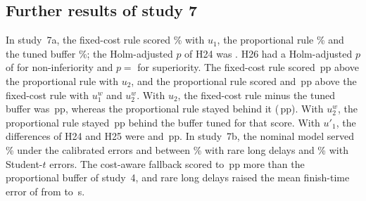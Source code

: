 \subsection{Further results of study 7}
In study~7a, the fixed-cost rule scored \% with $u_1$, the proportional rule \%
and the tuned buffer \%; the Holm-adjusted $p$ of H24 was . H26 had a
Holm-adjusted $p$ of  for non-inferiority and $p={}$ for superiority. The
fixed-cost rule scored \,pp above the proportional rule with $u_2$, and the proportional rule
scored  and \,pp above the fixed-cost rule with $u^w_1$ and $u^w_2$.
With $u_2$, the fixed-cost rule minus the tuned buffer was \,pp, whereas the proportional rule
stayed behind it (\,pp). With $u^w_2$, the proportional rule stayed \,pp
behind the buffer tuned for that score. With $u'_1$, the differences of H24 and H25 were  and
\,pp. In study~7b, the nominal model served \% under the calibrated errors and
between \% with rare long delays and \% with Student-$t$ errors. The cost-aware
fallback scored  to \,pp more than the proportional buffer of study~4,
and rare long delays raised the mean finish-time error of \mname{} from  to \,s.
